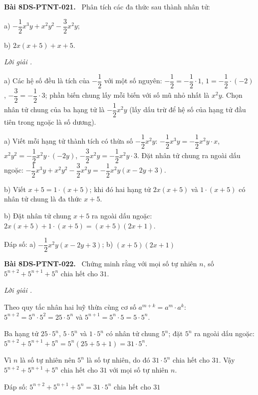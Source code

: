 \documentclass[12pt,a4paper]{article}
\newenvironment{problem}[1][]{\par\medskip\noindent\textbf{Bài #1.}\ }{\par}
\newenvironment{solution}[1][]{\par\noindent\textit{Lời giải #1.}\par}{\par}
\begin{document}
\begin{problem}[8DS-PTNT-021]
Phân tích các đa thức sau thành nhân tử:

a) $-\dfrac{1}{2}x^3y + x^2y^2 - \dfrac{3}{2}x^2y$;

b) $2x(x + 5) + x + 5$.

\begin{solution}
a) Các hệ số đều là tích của $-\dfrac{1}{2}$ với một số nguyên: $-\dfrac{1}{2} = -\dfrac{1}{2} \cdot 1$, $1 = -\dfrac{1}{2} \cdot (-2)$, $-\dfrac{3}{2} = -\dfrac{1}{2} \cdot 3$; phần biến chung lấy mỗi biến với số mũ nhỏ nhất là $x^2y$. Chọn nhân tử chung của ba hạng tử là $-\dfrac{1}{2}x^2y$ (lấy dấu trừ để hệ số của hạng tử đầu tiên trong ngoặc là số dương).

a) Viết mỗi hạng tử thành tích có thừa số $-\dfrac{1}{2}x^2y$: $-\dfrac{1}{2}x^3y = -\dfrac{1}{2}x^2y \cdot x$, $x^2y^2 = -\dfrac{1}{2}x^2y \cdot (-2y)$, $-\dfrac{3}{2}x^2y = -\dfrac{1}{2}x^2y \cdot 3$. Đặt nhân tử chung ra ngoài dấu ngoặc: $-\dfrac{1}{2}x^3y + x^2y^2 - \dfrac{3}{2}x^2y = -\dfrac{1}{2}x^2y(x - 2y + 3)$.

b) Viết $x + 5 = 1 \cdot (x + 5)$; khi đó hai hạng tử $2x(x + 5)$ và $1 \cdot (x + 5)$ có nhân tử chung là đa thức $x + 5$.

b) Đặt nhân tử chung $x + 5$ ra ngoài dấu ngoặc: $2x(x + 5) + 1 \cdot (x + 5) = (x + 5)(2x + 1)$.

Đáp số: a) $\boxed{-\dfrac{1}{2}x^2y(x - 2y + 3)}$; b) $\boxed{(x + 5)(2x + 1)}$
\end{solution}
\end{problem}

\begin{problem}[8DS-PTNT-022]
Chứng minh rằng với mọi số tự nhiên $n$, số $5^{n + 2} + 5^{n + 1} + 5^n$ chia hết cho $31$.

\begin{solution}
Theo quy tắc nhân hai luỹ thừa cùng cơ số $a^{m + k} = a^m \cdot a^k$: $5^{n + 2} = 5^n \cdot 5^2 = 25 \cdot 5^n$ và $5^{n + 1} = 5^n \cdot 5 = 5 \cdot 5^n$.

Ba hạng tử $25 \cdot 5^n$, $5 \cdot 5^n$ và $1 \cdot 5^n$ có nhân tử chung $5^n$; đặt $5^n$ ra ngoài dấu ngoặc: $5^{n + 2} + 5^{n + 1} + 5^n = 5^n(25 + 5 + 1) = 31 \cdot 5^n$.

Vì $n$ là số tự nhiên nên $5^n$ là số tự nhiên, do đó $31 \cdot 5^n$ chia hết cho $31$. Vậy $5^{n + 2} + 5^{n + 1} + 5^n$ chia hết cho $31$ với mọi số tự nhiên $n$.

Đáp số: $\boxed{5^{n + 2} + 5^{n + 1} + 5^n = 31 \cdot 5^n \text{ chia hết cho } 31}$
\end{solution}
\end{problem}
\end{document}
